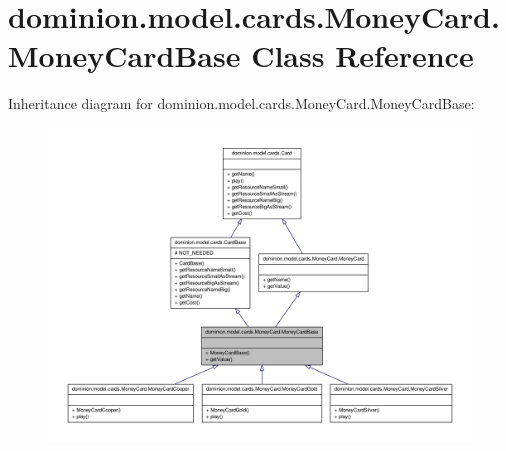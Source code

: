 \hypertarget{classdominion_1_1model_1_1cards_1_1MoneyCard_1_1MoneyCardBase}{\section{dominion.\-model.\-cards.\-Money\-Card.\-Money\-Card\-Base \-Class \-Reference}
\label{classdominion_1_1model_1_1cards_1_1MoneyCard_1_1MoneyCardBase}
}


\-Inheritance diagram for dominion.\-model.\-cards.\-Money\-Card.\-Money\-Card\-Base\-:
\nopagebreak
\begin{figure}[H]
\begin{center}
\leavevmode
\includegraphics[width=350pt]{classdominion_1_1model_1_1cards_1_1MoneyCard_1_1MoneyCardBase__inherit__graph}
\end{center}
\end{figure}


